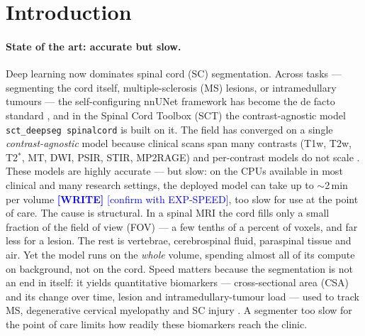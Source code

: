 \documentclass[11pt]{article}
\newcommand{\WRITE}[1]{\textcolor{blue}{\textbf{[WRITE]} #1}}
\begin{document}
\section{Introduction}\label{sec:intro}
\paragraph{State of the art: accurate but slow.}
Deep learning now dominates spinal cord (SC) segmentation. Across tasks ---
segmenting the cord itself, multiple-sclerosis (MS) lesions, or intramedullary
tumours --- the self-configuring nnUNet framework \cite{isensee2021nnunet} has
become the de facto standard \cite{}, and in the Spinal Cord Toolbox (SCT) the
contrast-agnostic model \texttt{sct\_deepseg spinalcord} \cite{bedard2025media} is
built on it. The field has converged on a single \emph{contrast-agnostic} model
because clinical scans span many contrasts (T1w, T2w, T2$^\ast$, MT, DWI, PSIR,
STIR, MP2RAGE) and per-contrast models do not scale \cite{bedard2025media}. These
models are highly accurate --- but slow: on the CPUs available in most clinical
and many research settings, the deployed model can take up to $\sim$2\,min per
volume \WRITE{[confirm with EXP-SPEED]}, too slow for use at the point of care.
The cause is structural. In a spinal MRI the cord fills only a small fraction of
the field of view (FOV) --- a few tenths of a percent of voxels, and far less for
a lesion. The rest is vertebrae, cerebrospinal fluid, paraspinal tissue and air.
Yet the model runs on the \emph{whole} volume, spending almost all of its compute
on background, not on the cord. Speed matters because the segmentation is not an
end in itself: it yields quantitative biomarkers --- cross-sectional area (CSA)
and its change over time, lesion and intramedullary-tumour load --- used to track
MS, degenerative cervical myelopathy and SC injury \cite{bedard2025media,
karthik2026imag}. A segmenter too slow for the point of care limits how readily
these biomarkers reach the clinic.
\end{document}
